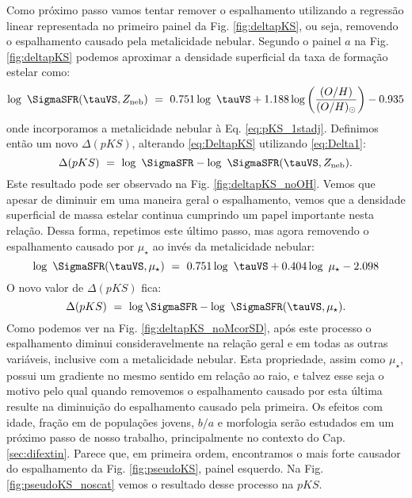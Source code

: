 Como próximo passo vamos tentar remover o espalhamento utilizando a regressão linear representada no
primeiro painel da Fig. \ref{fig:deltapKS}, ou seja, removendo o espalhamento causado pela
metalicidade nebular. Segundo o painel $a$ na Fig. \ref{fig:deltapKS} podemos aproximar a densidade
superficial da taxa de formação estelar como:
\begin{equation}
	\log\ \SigmaSFR(\tauVS, Z_{\mathrm{neb}})\ =\ 0.751 \log\ \tauVS + 1.188 \log
\left(\frac{(O/H)}{(O/H)_\odot}\right) - 0.935
	\label{eq:Delta1}
\end{equation}
\noindent onde incorporamos a metalicidade nebular à Eq. \eqref{eq:pKS_1stadj}. Definimos então um
novo $\Delta(pKS)$, alterando \eqref{eq:DeltapKS} utilizando \eqref{eq:Delta1}:
\begin{equation}
	\Delta(pKS)\ =\ \log\ \SigmaSFR - \log\ \SigmaSFR(\tauVS, Z_{\mathrm{neb}}).
\end{equation}
\noindent Este resultado pode ser observado na Fig. \ref{fig:deltapKS_noOH}. Vemos que apesar
de diminuir em uma maneira geral o espalhamento, vemos que a densidade superficial de massa estelar
continua cumprindo um papel importante nesta relação. Dessa forma, repetimos este último passo, mas
agora removendo o espalhamento causado por $\mu_\star$ ao invés da metalicidade nebular:
\begin{equation}
	\log\ \SigmaSFR(\tauVS, \mu_\star)\ =\ 0.751 \log\ \tauVS + 0.404 \log\ \mu_\star - 2.098
	\label{eq:Delta2}
\end{equation}
\noindent O novo valor de $\Delta(pKS)$ fica:
\begin{equation}
	\Delta(pKS)\ =\ \log \SigmaSFR - \log\ \SigmaSFR(\tauVS, \mu_\star).
\end{equation}
\noindent Como podemos ver na Fig. \ref{fig:deltapKS_noMcorSD}, após este processo o
espalhamento diminui consideravelmente na relação geral e em todas as outras variáveis, inclusive
com a metalicidade nebular. Esta propriedade, assim como $\mu_\star$, possui um gradiente no mesmo
sentido em relação ao raio, e talvez esse seja o motivo pelo qual quando removemos o espalhamento
causado por esta última resulte na diminuição do espalhamento causado pela primeira. Os efeitos com
idade, fração em de populações jovens, $b/a$ e morfologia serão estudados em um próximo passo de
nosso trabalho, principalmente no contexto do Cap. \ref{sec:difextin}. Parece que, em primeira
ordem, encontramos o mais forte causador do espalhamento da Fig. \ref{fig:pseudoKS}, painel
esquerdo. Na Fig. \ref{fig:pseudoKS_noscat} vemos o resultado desse processo na $pKS$.

